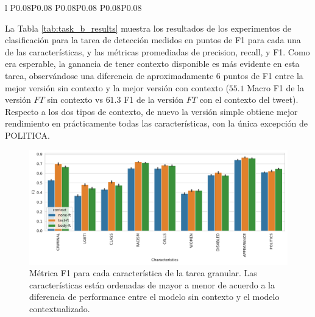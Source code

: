 \begin{table}
\begin{tabular}{l P{0.08\textwidth}P{0.08\textwidth} P{0.08\textwidth}P{0.08\textwidth}  P{0.08\textwidth}P{0.08\textwidth}}
        \bottomrule
        \end{tabular}
    \caption{Resultados de los experimentos de clasificación para la tarea \emph{granular} de detección de discurso de odio, expresados como la media de las distintas métricas sobre diez corridas independientes. Cada modelo es un BERT con tres posibles entradas: sólo el comentario (\emph{Sin contexto}), el tweet de la noticia a la cual responde el comentario (\emph{Tweet}), y el tweet más el cuerpo de la noticia (\emph{Tweet + Cuerpo}). Para cada una de estas posibilidades usamos dos versiones: una sobre BETO($\neg$FT) y otra sobre BETO ajustado al dominio (FT) de acuerdo a lo descripto en la sección \ref{sec:contextualized_classifiers}}
    \label{tab:task_b_results}
\end{table}



La Tabla \ref{tab:task_b_results} muestra los resultados de los experimentos de clasificación para la tarea de detección  medidos en puntos de F1 para cada una de las características, y las métricas promediadas de precision, recall, y F1. Como era esperable, la ganancia de tener contexto disponible es más evidente en esta tarea, observándose una diferencia de aproximadamente 6 puntos de F1 entre la mejor versión sin contexto y la mejor versión con contexto ($55.1$ Macro F1 de la versión $FT$ sin contexto vs $61.3$ F1 de la versión $FT$ con el contexto del tweet). Respecto a los dos tipos de contexto, de nuevo la versión simple obtiene mejor rendimiento en prácticamente todas las características, con la única excepción de POLITICA.


\begin{figure}[]
    \centering
    \includegraphics[width=\textwidth]{img/task_b_scores.pdf}
    \caption{Métrica F1 para cada característica de la tarea granular. Las características están ordenadas de mayor a menor de acuerdo a la diferencia de performance entre el modelo sin contexto y el modelo contextualizado. }
    \label{fig:barplot_task_b_results}
\end{figure}

